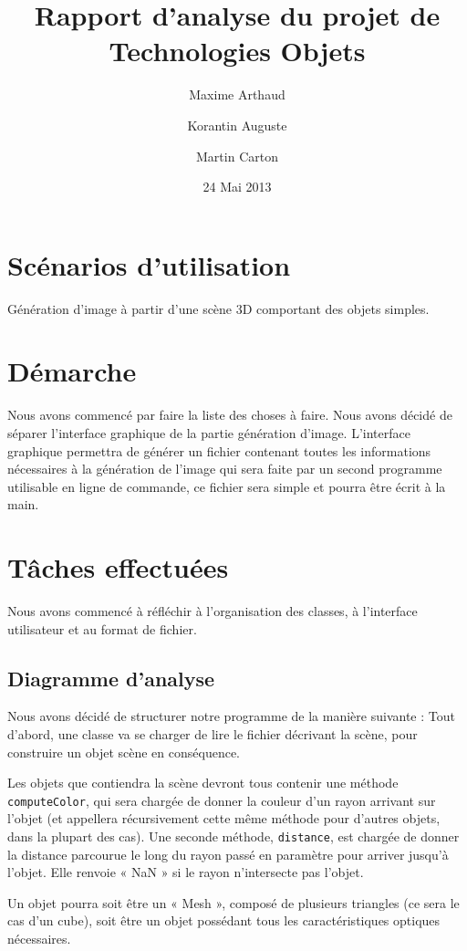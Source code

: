 \documentclass[a4paper]{article}
\title{Rapport d'analyse du projet de Technologies Objets}
\author{Maxime Arthaud \and Korantin Auguste \and Martin Carton}
\date{24 Mai 2013}
\begin{document}
\maketitle

\section{Scénarios d'utilisation}
  Génération d'image à partir d'une scène 3D comportant des objets simples.

\section{Démarche}
  Nous avons commencé par faire la liste des choses à faire. Nous avons décidé
  de séparer l'interface graphique de la partie génération d'image. L'interface
  graphique permettra de générer un fichier contenant toutes les informations
  nécessaires à la génération de l'image qui sera faite par un second programme
  utilisable en ligne de commande, ce fichier sera simple et pourra être écrit
  à la main.

\section{Tâches effectuées}
  Nous avons commencé à réfléchir à l'organisation des classes, à l'interface
  utilisateur et au format de fichier.

  \subsection{Diagramme d'analyse}

    Nous avons décidé de structurer notre programme de la manière suivante :
    Tout d'abord, une classe va se charger de lire le fichier décrivant la scène,
    pour construire un objet scène en conséquence.

    Les objets que contiendra la scène devront tous contenir une méthode
    \verb+computeColor+, qui sera chargée de donner la couleur d'un rayon
    arrivant sur l'objet (et appellera récursivement cette même méthode pour
    d'autres objets, dans la plupart des cas).
    Une seconde méthode, \verb+distance+, est chargée de donner la distance parcourue
    le long du rayon passé en paramètre pour arriver jusqu'à l'objet. Elle renvoie « NaN »
    si le rayon n'intersecte pas l'objet.

    Un objet pourra soit être un « Mesh », composé de plusieurs triangles (ce sera le cas
    d'un cube), soit être un objet possédant tous les caractéristiques optiques nécessaires.
\end{document}
